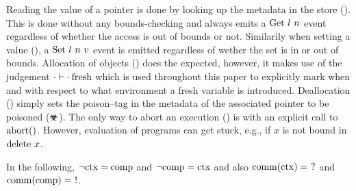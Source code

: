 \documentclass[acmsmall,review,screen,dvipsnames]{acmart}
\begin{document}
Reading the value of a pointer is done by looking up the metadata in the store ().
This is done without any bounds-checking and always emits a $\text{Get}\ l\ n$ event regardless of whether the access is out of bounds or not.
Similarily when setting a value (), a $\ev{Set}\ \loc\ n\ \valueexpr$ event is emitted regardless of wether the set is in or out of bounds.
Allocation of objects () does the expected, however, it makes use of the judgement $\cdot\vdash{\cdot}\operatorname{fresh}$ which is used throughout this paper to explicitly mark when and with respect to what environment a fresh variable is introduced.
Deallocation () simply sets the poison--tag in the metadata of the associated pointer to be poisoned ($\poisoned$).
The only way to abort an execution () is with an explicit call to $\text{abort()}$.
However, evaluation of programs can get stuck, e.g., if $x$ is not bound in $\text{delete}\ x$.

In the following, $\neg\text{ctx}=\text{comp}$ and $\neg\text{comp}=\text{ctx}$ and also $\operatorname{comm}(\text{ctx})=\  ? $ and $\operatorname{comm}(\comp)=\ \comptoctx$.
\end{document}
